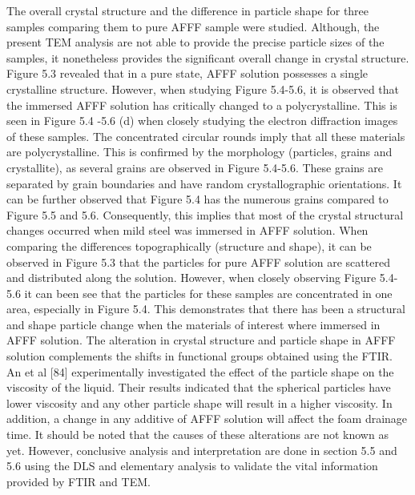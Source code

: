\documentclass[12pt]{report}
\begin{document}
The overall crystal structure and the difference in particle shape for three samples comparing them to pure AFFF sample were studied. Although, the present TEM analysis are not able to provide the precise particle sizes of the samples, it nonetheless provides the significant overall change in crystal structure. Figure 5.3 revealed that in a pure state, AFFF solution possesses a single crystalline structure. However, when studying Figure 5.4-5.6, it is observed that the immersed AFFF solution has critically changed to a polycrystalline. This is seen in Figure 5.4 -5.6 (d) when closely studying the electron diffraction images of these samples. The concentrated circular rounds imply that all these materials are polycrystalline. This is confirmed by the morphology (particles, grains and crystallite), as several grains are observed in Figure 5.4-5.6. These grains are separated by grain boundaries and have random crystallographic orientations. It can be further observed that Figure 5.4 has the numerous grains compared to Figure 5.5 and 5.6.  Consequently, this implies that most of the crystal structural changes occurred when mild steel was immersed in AFFF solution. 
When comparing the differences topographically (structure and shape), it can be observed in Figure 5.3 that the particles for pure AFFF solution are scattered and distributed along the solution. However, when closely observing Figure 5.4-5.6 it can been see that the particles for these samples are concentrated in one area, especially in Figure 5.4. This demonstrates that there has been a structural and shape particle change when the materials of interest where immersed in AFFF solution. The alteration in crystal structure and particle shape in AFFF solution complements the shifts in functional groups obtained using the FTIR. An et al [84] experimentally investigated the effect of the particle shape on the viscosity of the liquid. Their results indicated that the spherical particles have lower viscosity and any other particle shape will result in a higher viscosity. In addition, a change in any additive of AFFF solution will affect the foam drainage time. It should be noted that the causes of these alterations are not known as yet. However, conclusive analysis and interpretation are done in section 5.5 and 5.6 using the DLS and elementary analysis to validate the vital information provided by FTIR and TEM.
\end{document}
